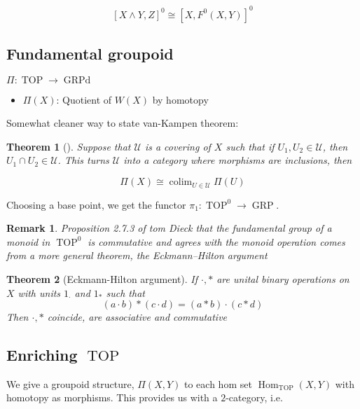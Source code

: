 \documentclass[12pt]{article}
\newtheorem*{thm*}{Theorem}
\newtheorem*{rmk}{Remark}
\newcommand{\mc}{\mathcal}
\DeclareMathOperator{\Hom}{Hom}
\DeclareMathOperator{\colim}{colim}
\DeclareMathOperator{\TOP}{TOP}
\DeclareMathOperator{\GRP}{GRP}
\DeclareMathOperator{\GRPd}{GRPd}
\begin{document}
\[\left[X\wedge Y,Z\right]^0\cong\left[X,F^0(X,Y)\right]^0\]

\subsection{Fundamental groupoid}

$\Pi:\TOP\to\GRPd$
\begin{itemize}
    \item $\Pi(X)$: Quotient of $W(X)$ by homotopy
\end{itemize}

Somewhat cleaner way to state van-Kampen theorem:

\begin{thm*}[] 
    Suppose that $\mc U$ is a covering of $X$ such that if $U_1,U_2\in\mc U$, then $U_1\cap U_2\in\mc U$. This turns $\mc U$ into a category where morphisms are inclusions, then 

    \[\Pi(X)\cong\colim_{U\in\mc U}\Pi(U)\]
\end{thm*}

Choosing a base point, we get the functor $\pi_1:\TOP^0\to\GRP$.

\begin{rmk}
    Proposition 2.7.3 of tom Dieck that the fundamental group of a monoid in $\TOP^0$ is commutative and agrees with the monoid operation comes from a more general theorem, the Eckmann–Hilton argument
\end{rmk}

\begin{thm*}[Eckmann-Hilton argument]
    If $\cdot,*$ are unital binary operations on $X$ with units $1_\cdot$ and $1_*$ such that 
    \[\left(a\cdot b\right)*\left(c\cdot d\right)=\left(a*b\right)\cdot\left(c*d\right)\]
    Then $\cdot,*$ coincide, are associative and commutative
\end{thm*}

\subsection{Enriching $\TOP$}

We give a groupoid structure, $\Pi(X,Y)$ to each hom set $\Hom_{\TOP}(X,Y)$ with homotopy as morphisms. This provides us with a $2$-category, i.e.
\end{document}
